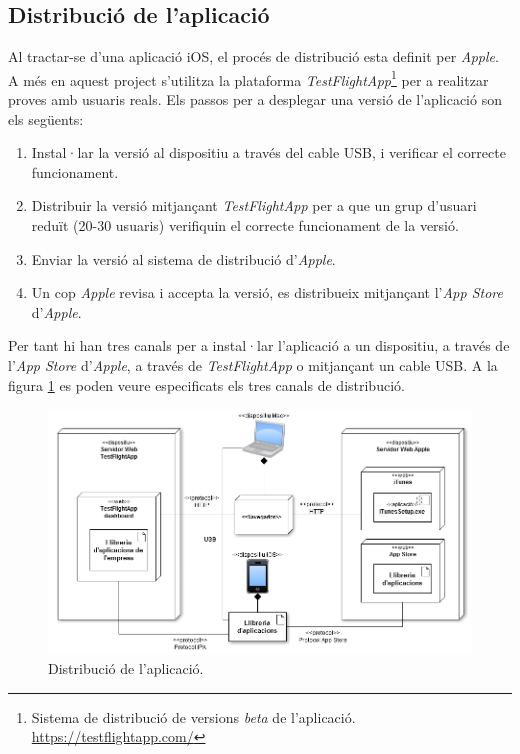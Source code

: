 
\subsection{Distribució de l'aplicació}

Al tractar-se d'una aplicació iOS, el procés de distribució esta definit per \textit{Apple}. A més en aquest project s'utilitza la plataforma \textit{TestFlightApp}\footnote{Sistema de distribució de versions \textit{beta} de l'aplicació. \url{https://testflightapp.com/}} per a realitzar proves amb usuaris reals. Els passos per a desplegar una versió de l'aplicació son els següents:

\begin{enumerate}
    \item Instal·lar la versió al dispositiu a través del cable USB, i verificar el correcte funcionament.
    \item Distribuir la versió mitjançant \textit{TestFlightApp} per a que un grup d'usuari reduït (20-30 usuaris) verifiquin el correcte funcionament de la versió.
    \item Enviar la versió al sistema de distribució d'\textit{Apple}.
    \item Un cop \textit{Apple} revisa i accepta la versió, es distribueix mitjançant l'\textit{App Store} d'\textit{Apple}.
\end{enumerate}

Per tant hi han tres canals per a instal·lar l'aplicació a un dispositiu, a través de l'\textit{App Store} d'\textit{Apple}, a través de \textit{TestFlightApp} o mitjançant un cable USB. A la figura \ref{fig:distribucio} es poden veure especificats els tres canals de distribució.

\begin{figure}[ht]
    \centering
    \includegraphics*[scale=0.5]{Memoria/Arquitectura/Projecte/distribucio.png}
    \caption{Distribució de l'aplicació.}
    \label{fig:distribucio}
\end{figure}
\clearpage
